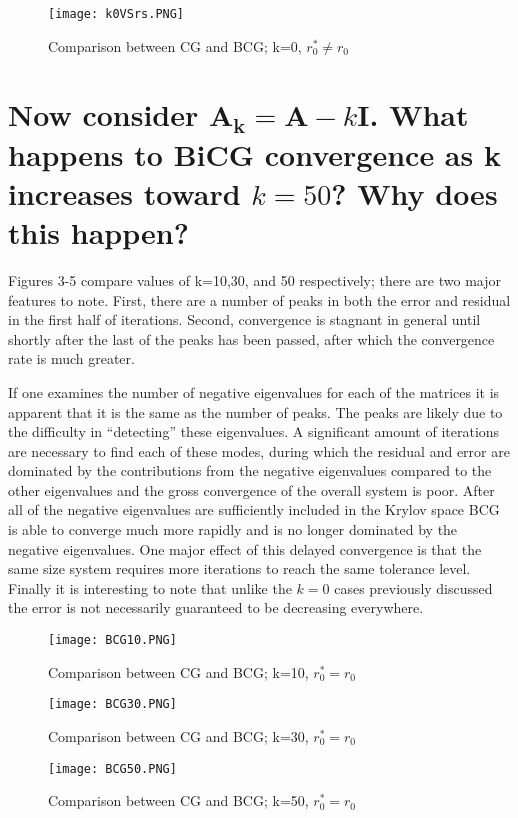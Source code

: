 \documentclass[letterpaper,10pt]{article}
\begin{document}
\begin{figure}[!htb]
\centering
\texttt{[image: k0VSrs.PNG]}
\caption{Comparison between CG and BCG; k=0, $r^*_0 \neq r_0$}
\end{figure}

\section*{ Now consider $\mathbf{A_k}=\mathbf{A}-k\mathbf{I}$. What happens to BiCG convergence as k increases toward $k=50$? Why does this happen?}
Figures 3-5 compare values of k=10,30, and 50 respectively; there are two major features to note. First, there are a number of peaks in both the error and residual in the first half of iterations. Second, convergence is stagnant in general until shortly after the last of the peaks has been passed, after which the convergence rate is much greater.

If one examines the number of negative eigenvalues for each of the matrices it is apparent that it is the same as the number of peaks. The peaks are likely due to the difficulty in ``detecting'' these eigenvalues. A significant amount of iterations are necessary to find each of these modes, during which the residual and error are dominated by the contributions from the negative eigenvalues compared to the other eigenvalues and the gross convergence of the overall system is poor. After all of the negative eigenvalues are sufficiently included in the Krylov space BCG is able to converge much more rapidly and is no longer dominated by the negative eigenvalues. One major effect of this delayed convergence is that the same size system requires more iterations to reach the same tolerance level. Finally it is interesting to note that unlike the $k=0$ cases previously discussed the error is not necessarily guaranteed to be decreasing everywhere.

\begin{figure}[!htb]
\centering
\texttt{[image: BCG10.PNG]}
\caption{Comparison between CG and BCG; k=10, $r^*_0 = r_0$}
\end{figure}
\begin{figure}[!htb]
\centering
\texttt{[image: BCG30.PNG]}
\caption{Comparison between CG and BCG; k=30, $r^*_0 = r_0$}
\end{figure}
\begin{figure}[!htb]
\centering
\texttt{[image: BCG50.PNG]}
\caption{Comparison between CG and BCG; k=50, $r^*_0 = r_0$}
\end{figure}
\end{document}
